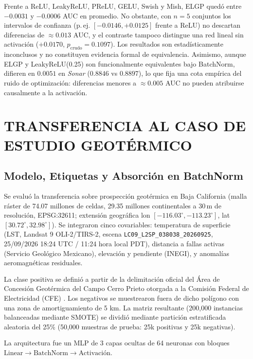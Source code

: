 \documentclass[10pt,twocolumn,letterpaper]{article}
\begin{document}
Frente a ReLU, LeakyReLU, PReLU, GELU, Swish y Mish, ELGP quedó entre $-0.0031$ y $-0.0006$ AUC en promedio. No obstante, con $n=5$ conjuntos los intervalos de confianza (p.\,ej. $[-0.0146, +0.0125]$ frente a ReLU) no descartan diferencias de $\approx 0.013$ AUC, y el contraste tampoco distingue una red lineal sin activación ($+0.0170$, $p_{\mathrm{crudo}}=0.1097$). Los resultados son estadísticamente inconclusos y no constituyen evidencia formal de equivalencia. Asimismo, aunque ELGP y LeakyReLU(0.25) son funcionalmente equivalentes bajo BatchNorm, difieren en $0.0051$ en \emph{Sonar} ($0.8846$ vs $0.8897$), lo que fija una cota empírica del ruido de optimización: diferencias menores a $\approx 0.005$ AUC no pueden atribuirse causalmente a la activación.

\section{TRANSFERENCIA AL CASO DE ESTUDIO GEOTÉRMICO}

\subsection{Modelo, Etiquetas y Absorción en BatchNorm}
Se evaluó la transferencia sobre prospección geotérmica en Baja California (malla ráster de 74.07 millones de celdas, 29.35 millones continentales a 30\,m de resolución, EPSG:32611; extensión geográfica lon $[-116.03^\circ, -113.23^\circ]$, lat $[30.72^\circ, 32.98^\circ]$). Se integraron cinco covariables: temperatura de superficie (LST, Landsat 9 OLI-2/TIRS-2, escena \texttt{LC09\_L2SP\_038038\_20260925}, 25/09/2026 18:24 UTC / 11:24 hora local PDT), distancia a fallas activas (Servicio Geológico Mexicano), elevación y pendiente (INEGI), y anomalías aeromagnéticas residuales.

La clase positiva se definió a partir de la delimitación oficial del Área de Concesión Geotérmica del Campo Cerro Prieto otorgada a la Comisión Federal de Electricidad (CFE) \citep{cfe2015,lippmann1991}. Los negativos se muestrearon fuera de dicho polígono con una zona de amortiguamiento de 5 km. La matriz resultante (200{,}000 instancias balanceadas mediante SMOTE) se dividió mediante partición estratificada aleatoria del 25\% (50{,}000 muestras de prueba: 25k positivas y 25k negativas).

La arquitectura fue un MLP de 3 capas ocultas de 64 neuronas con bloques $\text{Linear} \to \text{BatchNorm} \to \text{Activación}$.
\end{document}
